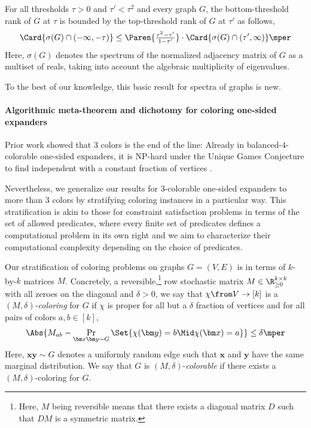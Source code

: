 \begin{theorem}
  For all thresholds \(\tau>0\) and \(\tau'<\tau^{2}\) and every graph \(G\), the bottom-threshold rank of \(G\) at \(\tau\) is bounded by the top-threshold rank of \(G\) at \(\tau'\) as follows,
  \begin{equation}    
    \Card{ \sigma(G)\cap (-\infty,-\tau)
    }
    \le
    \Paren{
      \tfrac{\tau^{2}-\tau'}{1-\tau'}}
    \cdot \Card{
\sigma(G)\cap (\tau',\infty)
    }
    \mper
  \end{equation}
  Here, \(\sigma(G)\) denotes the spectrum of the normalized adjacency matrix of \(G\) as a multiset of reals, taking into account the algebraic multiplicity of eigenvalues.
\end{theorem}

To the best of our knowledge, this basic result for spectra of graphs is new.

\paragraph{Algorithmic meta-theorem and dichotomy for coloring one-sided expanders}

Prior work showed that \(3\) colors is the end of the line:
Already in balanced-\(4\)-colorable one-sided expanders, it is NP-hard under the Unique Games Conjecture to find independent with a constant fraction of vertices \cite{bafna-hsieh-kothari}.

Nevertheless, we generalize our results for \(3\)-colorable one-sided expanders to more than \(3\) colors by stratifying coloring instances in a particular way.
This stratification is akin to those for constraint satisfaction problems in terms of the set of allowed predicates, where every finite set of predicates defines a computational problem in its own right and we aim to characterize their computational complexity depending on the choice of predicates.

Our stratification of coloring problems on graphs \(G=(V,E)\) is in terms of \(k\)-by-\(k\) matrices \(M\).
Concretely, a reversible,\footnote{Here, \(M\) being reversible means that there exists a diagonal matrix \(D\) such that \(D M\) is a symmetric matrix.} row stochastic matrix \(M\in \R_{\ge 0}^{k\times k}\) with all zeroes on the diagonal and \(\delta>0\), we say that \(\chi\from V\to [k]\) is a \emph{\((M,\delta)\)-coloring} for \(G\) if \(\chi\) is proper for all but a \(\delta\) fraction of vertices and for all pairs of colors \(a,b\in [k]\),
\begin{equation}
  \Abs{M_{ab} - \Pr_{\bm x\bm y \sim G}\Set{\chi(\bm y)=b\Mid \chi(\bm x)=a}}
  \le \delta\mper
\end{equation}
Here, \(\bm x\bm y\sim G\) denotes a uniformly random edge such that \(\bm x\) and \(\bm y\) have the same marginal distribution.
We say that \(G\) is \((M,\delta)\)-\emph{colorable} if there exists a \((M,\delta)\)-coloring for \(G\).

